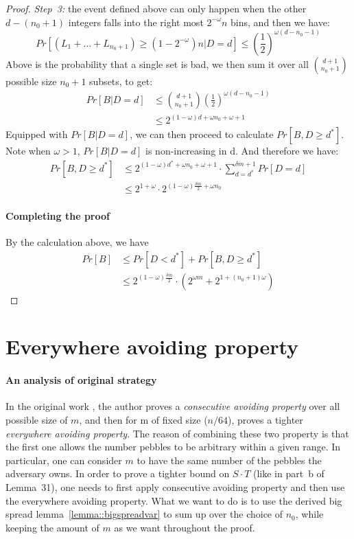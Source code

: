 \documentclass[a4paper, oneside]{article}
\begin{document}
\begin{proof}
  \textit{Step~3:} the event defined above can only happen when the other $d - (n_0 + 1)$ integers falls into the right most $2^{-\omega}n$ bins, and then
  we have:
  \begin{equation}
    Pr[(L_1 + \dots + L_{n_0+1}) \geq (1-2^{-\omega})n|D = d] \leq (\frac{1}{2})^{\omega(d-n_0-1)}
  \end{equation}
  Above is the probability that a single set is bad, we then sum it over all $\binom{d+1}{n_0+1}$ possible size $n_0 + 1$ subsets, to get:
  \begin{align}
    Pr[B|D = d] &\leq \binom{d+1}{n_0+1}(\frac{1}{2})^{\omega(d-n_0-1)} \\
    &\leq 2^{(1-\omega)d + \omega n_0 + \omega + 1}
  \end{align}
  Equipped with $Pr[B|D = d]$, we can then proceed to calculate $Pr[B, D \geq d^*]$. Note when $\omega > 1$, $Pr[B|D = d]$ is non-increasing
  in d. And therefore we have:
  \begin{align}
    Pr[B, D \geq d^*] &\leq 2^{(1-\omega)d^* + \omega n_0 + \omega + 1} \cdot \sum_{d = d^*}^{\delta m + 1}{Pr[D = d]} \\
    &\leq 2^{1+\omega} \cdot 2^{(1-\omega)\frac{\delta m}{2} + \omega n_0}
  \end{align}

  \paragraph{Completing the proof}
  By the calculation above, we have
  \begin{align}
    Pr[B] &\leq Pr[D < d^*] + Pr[B, D \geq d^*] \\
    &\leq 2^{(1-\omega)\frac{\delta m}{2}} \cdot (2^{\omega m} + 2^{1+(n_0+1)\omega})
  \end{align}
\end{proof}

\section{Everywhere avoiding property}
\paragraph{An analysis of original strategy}
In the original work \cite{corrigan2016balloon}, the author proves a \textit{consecutive avoiding property} over all possible size of $m$, and
then for m of fixed size ($n/64$), proves a tighter \textit{everywhere avoiding property}. The reason of combining these two property is that
the first one allows the number pebbles to be arbitrary within a given range. In particular, one can consider $m$ to have the same number of the
pebbles the adversary owns. In order to prove a tighter bound on $S \cdot T$ (like in part~b of Lemma~31), one needs to first apply consecutive 
avoiding property and then use the everywhere avoiding property. What we want to do is to use the derived big spread lemma~\ref{lemma::bigspreadvar}
to sum up over the choice of $n_0$, while keeping the amount of $m$ as we want throughout the proof.
\end{document}
